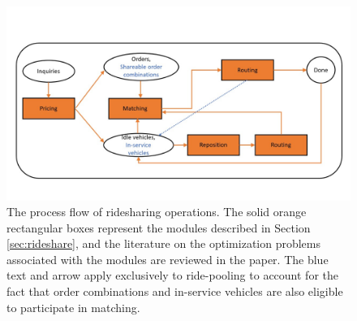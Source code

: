 \documentclass{article}
\newcommand{\tq}[1]{\textcolor{red}{#1}}
\begin{document}



\begin{figure}
\begin{center}
        \includegraphics[width=0.85\linewidth]{img/ridesharing_full.png}
	\caption{The process flow of ridesharing operations. The solid orange rectangular boxes represent the modules described in Section \ref{sec:rideshare}, and the literature on the optimization problems associated with the modules are reviewed in the paper. The blue text and arrow apply exclusively to ride-pooling to account for the fact that order combinations and in-service vehicles are also eligible to participate in matching.}
	\label{fig:rideshare_process}
\end{center}
\end{figure}
\end{document}
